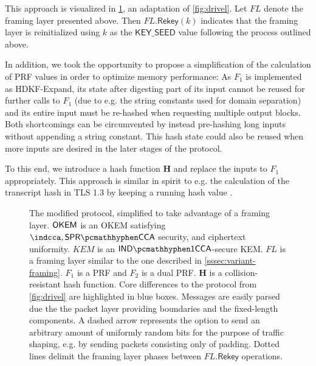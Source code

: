 This approach is visualized in \cref{fig:modified-drivel-framing}, an adaptation of \cref{fig:drivel}. Let $FL$ denote the framing layer presented above. Then $FL.\mathsf{Rekey}(k)$ indicates that the framing layer is reinitialized using $k$ as the $\mathsf{KEY\_SEED}$ value following the process outlined above.

In addition, we took the opportunity to propose a simplification of the calculation of PRF values in order to optimize memory performance:
As $F_1$ is implemented as \textsf{HDKF-Expand}, its state after digesting part of its input cannot be reused for further calls to $F_1$ (due to e.g. the string constants used for domain separation) and its entire input must be re-hashed when requesting multiple output blocks.
Both shortcomings can be circumvented by instead pre-hashing long inputs without appending a string constant. This hash state could also be reused when more inputs are desired in the later stages of the protocol.

To this end, we introduce a hash function $\mathbf{H}$ and replace the inputs to $F_1$ appropriately. This approach is similar in spirit to e.g. the calculation of the transcript hash in TLS 1.3 by keeping a running hash value \cite[Section~4.4.1]{rfc8446}.

\begin{figure}
    
    \caption[
        The modified \drivel{} protocol, simplified to take advantage of a framing layer.
    ]{
        The modified \drivel{} protocol, simplified to take advantage of a framing layer.
        $\mathsf{OKEM}$ is an OKEM satisfying $\indcca, \sprcca$ security, and ciphertext uniformity.
        $KEM$ is an $\indonecca$-secure KEM.
        $FL$ is a framing layer similar to the one described in \cref{sssec:variant-framing}.
        $F_1$ is a PRF and $F_2$ is a dual PRF.
        $\mathbf{H}$ is a collision-resistant hash function.
        Core differences to the \drivel{} protocol from \cref{fig:drivel} are highlighted in blue boxes.
        Messages are easily parsed due the the packet layer providing boundaries and the fixed-length components.
        A dashed arrow represents the option to send an arbitrary amount of uniformly random bits for the purpose of traffic shaping, e.g. by sending packets consisting only of padding.
        Dotted lines delimit the framing layer phases between $FL.\mathsf{Rekey}$ operations.
    }
    \label{fig:modified-drivel-framing}
\end{figure}


